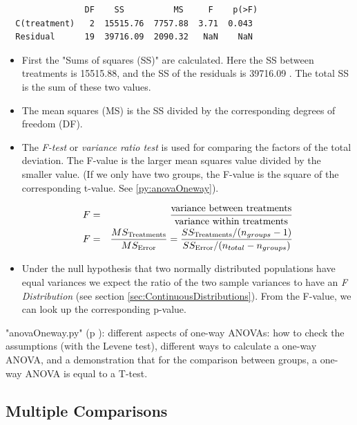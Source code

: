 \begin{verbatim}
                DF    SS          MS     F    p(>F)
  C(treatment)   2  15515.76  7757.88  3.71  0.043
  Residual      19  39716.09  2090.32   NaN    NaN
\end{verbatim}

\begin{itemize}
  \item First the "Sums of squares (SS)" are calculated. Here the SS between treatments is 15515.88, and the SS of the residuals is 39716.09 . The total SS is the sum of these two values.
  \item The mean squares (MS) is the SS divided by the corresponding degrees of freedom (DF).
  \item The \emph{F-test} or \emph{variance ratio test} is used for comparing the factors of the total deviation. The F-value is the larger mean squares value divided by the smaller value. (If we only have two groups, the F-value is the square of the corresponding t-value. See \ref{py:anovaOneway}).

      \begin{eqnarray}
        F &=& \frac{\text{variance between treatments}}{\text{variance within treatments}} \\
        F &=& \frac{MS_\text{Treatments}}{MS_\text{Error}} = {{SS_\text{Treatments} / (n_{groups}-1)} \over {SS_\text{Error} / (n_{total}-n_{groups})}}
      \end{eqnarray}

  \item Under the null hypothesis that two normally distributed populations have equal variances we expect the ratio of the two sample variances to have an \emph{F Distribution} (see section \ref{sec:ContinuousDistributions}). From the F-value, we can look up the corresponding p-value.
\end{itemize}

\PyImg "anovaOneway.py" (p \pageref{py:anovaOneway}): different aspects of one-way ANOVAs: how to check the assumptions (with the Levene test), different ways to calculate a one-way ANOVA, and a demonstration that for the comparison between groups, a one-way ANOVA is equal to a T-test.

\subsection{Multiple Comparisons}

